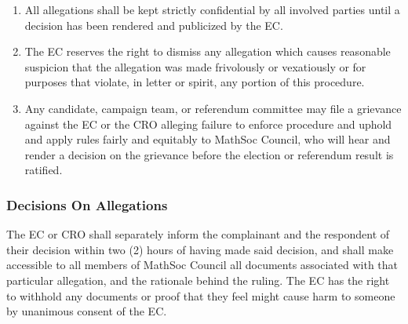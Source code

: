 \begin{enumerate}
			\item All allegations shall be kept strictly confidential by all involved parties until a decision has been rendered and publicized by the EC.
			\item The EC reserves the right to dismiss any allegation which causes reasonable suspicion that the allegation was made frivolously or vexatiously or for purposes that violate, in letter or spirit, any portion of this procedure.
			\item Any candidate, campaign team, or referendum committee may file a grievance against the EC or the CRO alleging failure to enforce procedure and uphold and apply rules fairly and equitably to MathSoc Council, who will hear and render a decision on the grievance before the election or referendum result is ratified.
		\end{enumerate}
    \subsubsection{Decisions On Allegations}
			The EC or CRO shall separately inform the complainant and the respondent of their decision within two (2) hours of having made said decision, and shall make accessible to all members of MathSoc Council all documents associated with that particular allegation, and the rationale behind the ruling. The EC has the right to withhold any documents or proof that they feel might cause harm to someone by unanimous consent of the EC.
